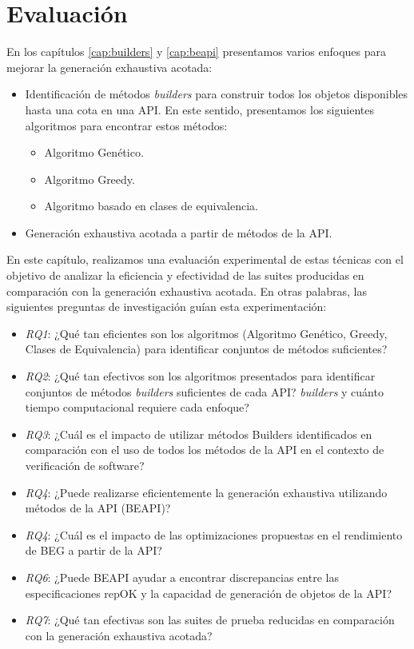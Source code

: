 \chapter[Evaluaci\'on]{Evaluaci\'on}
\label{cap:evaluation}



En los capítulos \ref{cap:builders} y \ref{cap:beapi} presentamos varios enfoques para mejorar la generación exhaustiva acotada:

\begin{itemize}
\item Identificación de métodos \emph{builders} para construir todos los objetos disponibles hasta una cota en una API. En este sentido, presentamos los siguientes algoritmos para encontrar estos métodos:
\begin{itemize}
\item Algoritmo Genético.
\item Algoritmo Greedy.
\item Algoritmo basado en clases de equivalencia.
\end{itemize}
\item Generación exhaustiva acotada a partir de métodos de la API.
\end{itemize}

En este capítulo, realizamos una evaluación experimental de estas técnicas con el objetivo de analizar la eficiencia y efectividad de las suites producidas en comparación con la generación exhaustiva acotada. En otras palabras, las siguientes preguntas de investigación guían esta experimentación:

\begin{itemize}
\item \emph{RQ1}: ¿Qué tan eficientes son los algoritmos (Algoritmo Genético, Greedy, Clases de Equivalencia) para identificar conjuntos de métodos suficientes? 
\item \emph{RQ2}: ¿Qué tan efectivos son los algoritmos presentados para identificar conjuntos de métodos \emph{builders} suficientes de cada API?
\emph{builders} y cuánto tiempo computacional requiere cada enfoque?
\item \emph{RQ3}: ¿Cuál es el impacto de utilizar métodos Builders identificados en comparación con el uso de todos los métodos de la API en el contexto de verificación de software?
\item \emph{RQ4}: ¿Puede realizarse eficientemente la generación exhaustiva utilizando métodos de la API (BEAPI)?
\item\emph{RQ4}: ¿Cuál es el impacto de las optimizaciones propuestas en el rendimiento de BEG a partir de la API?
\item\emph{RQ6}: ¿Puede BEAPI ayudar a encontrar discrepancias entre las especificaciones repOK y la capacidad de generación de objetos de la API?
\item\emph{RQ7}: ¿Qué tan efectivas son las suites de prueba reducidas en comparación con la generación exhaustiva acotada?
\end{itemize}

